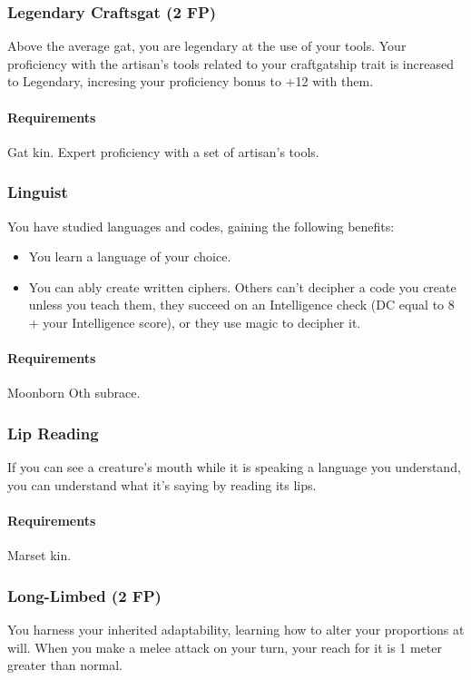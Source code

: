\subsubsection{Legendary Craftsgat (2 FP)} \label{feat::legendarycraftsgat}
    Above the average gat, you are legendary at the use of your tools.
    Your proficiency with the artisan's tools related to your craftgatship trait is increased to Legendary, incresing your proficiency bonus to +12 with them.
    \paragraph{Requirements} Gat kin. Expert proficiency with a set of artisan's tools.
\subsubsection{Linguist} \label{feat::linguist}
    You have studied languages and codes, gaining the following benefits:
    \begin{itemize}
        \item You learn a language of your choice.
        \item You can ably create written ciphers.
        Others can't decipher a code you create unless you teach them, they succeed on an Intelligence check (DC equal to 8 + your Intelligence score), or they use magic to decipher it. %
    \end{itemize}
    \paragraph{Requirements} Moonborn Oth subrace.
\subsubsection{Lip Reading} \label{feat::lipreading}
    If you can see a creature's mouth while it is speaking a language you understand, you can understand what it's saying by reading its lips.
    \paragraph{Requirements} Marset kin.
\subsubsection{Long-Limbed (2 FP)} \label{feat::longlimbed}
    You harness your inherited adaptability, learning how to alter your proportions at will.
    When you make a melee attack on your turn, your reach for it is 1 meter greater than normal.
